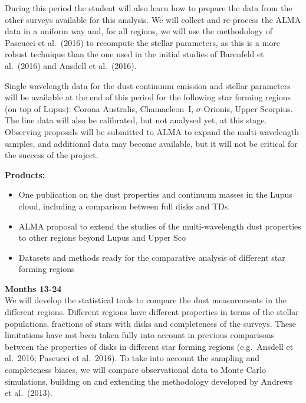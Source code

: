 \documentclass[10pt,fleqn,twoside]{article}
\begin{document}
During this period the student will also learn how to prepare the data from the other surveys available for this analysis. 
We will collect and re-process the ALMA data in a uniform way and, for all regions, we will use the methodology of Pascucci et al.~(2016) to recompute the stellar parameters, as this is a more robust 
technique than the one used in the initial studies of Barenfeld et al.~(2016) and Ansdell et al.~(2016).

Single wavelength data for the dust continuum emission and stellar parameters will be available at the end of this period for the following star forming regions (on top of Lupus): Corona Australis, Chamaeleon~I, $\sigma$-Orionis, Upper Scorpius. The line data will also be calibrated, but not analysed yet, at this stage. Observing proposals will be submitted to ALMA to expand the multi-wavelength samples, and additional data may become available, but it will not be critical for the success of the project.

\smallskip
{\bf Products:} 
\begin{itemize}
\item One publication on the dust properties and continuum masses in the Lupus cloud, including a comparison between full disks and TDs.
\item ALMA proposal to extend the studies of the multi-wavelength dust properties to other regions beyond Lupus and Upper Sco
\item Datasets and methods ready for the comparative analysis of different star forming regions
\end{itemize}

{\Tcol\bf Months 13-24}\\

We will develop the statistical tools to compare the dust measurements in the different regions.
Different regions have different properties in terms of the stellar populations, fractions of stars with disks and completeness of the surveys. These limitations have not been taken fully into account in previous 
comparisons between the properties of disks in different star forming regions (e.g.\ Ansdell et al.~2016; Pascucci et al.~2016). To take into account the sampling and completeness biases, we will compare observational data to Monte Carlo simulations, building on and extending the methodology developed by Andrews et al.~(2013).
\end{document}
